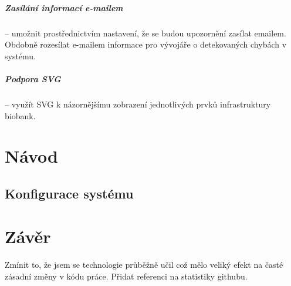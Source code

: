 \paragraph*{Zasílání informací e-mailem} -- umožnit prostřednictvím nastavení, že se budou upozornění zasílat emailem. Obdobně rozesílat e-mailem informace pro vývojáře o detekovaných chybách v systému.
\paragraph*{Podpora SVG} -- využít SVG k názornějšímu zobrazení jednotlivých prvků infrastruktury biobank.


\chapter{Návod}

\section{Konfigurace systému}

\chapter{Závěr}
Zmínit to, že jsem se technologie průběžně učil což mělo veliký efekt na časté zásadní změny v kódu práce. Přidat referenci na statistiky githubu.





